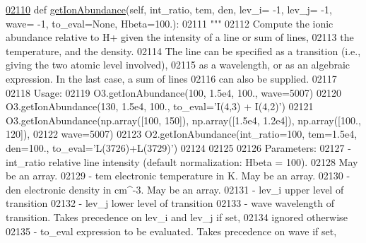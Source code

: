 \begin{DoxyCode}
\hypertarget{classpyneb_1_1core_1_1pynebcore_1_1_atom_l02110}{}\hyperlink{classpyneb_1_1core_1_1pynebcore_1_1_atom_a95230eab8816f670306adceffe6f6a48}{02110}     \textcolor{keyword}{def }\hyperlink{classpyneb_1_1core_1_1pynebcore_1_1_atom_a95230eab8816f670306adceffe6f6a48}{getIonAbundance}(self, int\_ratio, tem, den, lev\_i= -1, lev\_j= -1, wave= -1, 
      to\_eval=None, Hbeta=100.):
02111         \textcolor{stringliteral}{"""}
02112 \textcolor{stringliteral}{        Compute the ionic abundance relative to H+ given the intensity of a line or sum of lines, }
02113 \textcolor{stringliteral}{        the temperature, and the density. }
02114 \textcolor{stringliteral}{        The line can be specified as a transition (i.e., giving the two atomic level involved), }
02115 \textcolor{stringliteral}{        as a wavelength, or as an algebraic expression. In the last case, a sum of lines }
02116 \textcolor{stringliteral}{        can also be supplied.}
02117 \textcolor{stringliteral}{}
02118 \textcolor{stringliteral}{        Usage:}
02119 \textcolor{stringliteral}{            O3.getIonAbundance(100, 1.5e4, 100., wave=5007)}
02120 \textcolor{stringliteral}{            O3.getIonAbundance(130, 1.5e4, 100., to\_eval='I(4,3) + I(4,2)')}
02121 \textcolor{stringliteral}{            O3.getIonAbundance(np.array([100, 150]), np.array([1.5e4, 1.2e4]), np.array([100., 120]), }
02122 \textcolor{stringliteral}{                wave=5007)}
02123 \textcolor{stringliteral}{            O2.getIonAbundance(int\_ratio=100, tem=1.5e4, den=100., to\_eval='L(3726)+L(3729)')}
02124 \textcolor{stringliteral}{}
02125 \textcolor{stringliteral}{            }
02126 \textcolor{stringliteral}{        Parameters:}
02127 \textcolor{stringliteral}{            - int\_ratio    relative line intensity (default normalization: Hbeta = 100). }
02128 \textcolor{stringliteral}{                            May be an array.}
02129 \textcolor{stringliteral}{            - tem          electronic temperature in K. May be an array.}
02130 \textcolor{stringliteral}{            - den          electronic density in cm^-3. May be an array.}
02131 \textcolor{stringliteral}{            - lev\_i        upper level of transition}
02132 \textcolor{stringliteral}{            - lev\_j        lower level of transition}
02133 \textcolor{stringliteral}{            - wave         wavelength of transition. Takes precedence on lev\_i and lev\_j if set, }
02134 \textcolor{stringliteral}{                            ignored otherwise }
02135 \textcolor{stringliteral}{            - to\_eval      expression to be evaluated. Takes precedence on wave if set, }

\end{DoxyCode}
